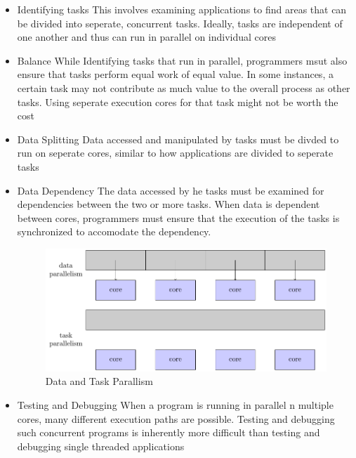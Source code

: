 \documentclass[oneside]{book}
\begin{document}
            \begin{itemize}
                \item Identifying tasks
                    \subitem This involves examining applications to find areas that can be divided into seperate, concurrent tasks. Ideally, tasks
                    are independent of one another and thus can run in parallel on individual cores
                \item Balance
                    \subitem While Identifying tasks that run in parallel, programmers msut also ensure that tasks perform equal work of equal value.
                    In some instances, a certain task may not contribute as much value to the overall process as other tasks. Using seperate execution cores
                    for that task might not be worth the cost
                \item Data Splitting
                    \subitem Data accessed and manipulated by tasks must be divded to run on seperate cores, similar to how applications are divided to seperate tasks
                \item Data Dependency
                    \subitem The data accessed by he tasks must be examined for dependencies between the two or more tasks. When data is dependent between cores,
                    programmers must ensure that the execution of the tasks is synchronized to accomodate the dependency.
                    \begin{figure}[H]
                        \centering
                        \includegraphics{figures/data_task_parallelism.pdf}
                        \caption{Data and Task Parallism}
                    \end{figure}
                \item Testing and Debugging
                    \subitem When a program is running in parallel n multiple cores, many different execution paths are possible. Testing and debugging such
                    concurrent programs is inherently more difficult than testing and debugging single threaded applications
            \end{itemize}
\end{document}
